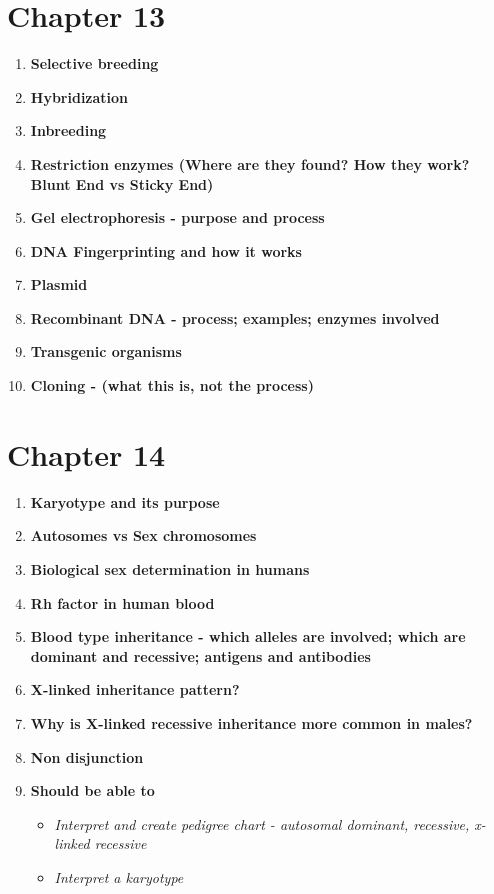\documentclass[9pt]{article}
\begin{document}
\section*{Chapter 13}
\begin{enumerate}
  \item {\bf Selective breeding}
  \item {\bf Hybridization}
  \item {\bf Inbreeding}
  \item {\bf Restriction enzymes (Where are they found? How they work? Blunt End vs Sticky End)}
  \item {\bf Gel electrophoresis  -  purpose and process}
  \item {\bf DNA Fingerprinting and how it works}
  \item {\bf Plasmid}
  \item {\bf Recombinant DNA  -  process; examples; enzymes involved}
  \item {\bf Transgenic organisms}
  \item {\bf Cloning  -  (what this is, not the process)}
\end{enumerate}
\section*{Chapter 14}
\begin{enumerate}
  \item {\bf Karyotype and its purpose}
  \item {\bf Autosomes vs Sex chromosomes}
  \item {\bf Biological sex determination in humans}
  \item {\bf Rh factor in human blood}
  \item {\bf Blood type inheritance - which alleles are involved; which are dominant and recessive; antigens and antibodies}
  \item {\bf X-linked inheritance pattern?}
  \item {\bf Why is X-linked recessive inheritance more common in males?}
  \item {\bf Non disjunction}
  \item {\bf Should be able to}
    \begin{itemize}
      \item {\em Interpret and create pedigree chart  -  autosomal dominant, recessive, x-linked recessive}
      \item {\em Interpret a karyotype}
    \end{itemize}
\end{enumerate}
\end{document}
